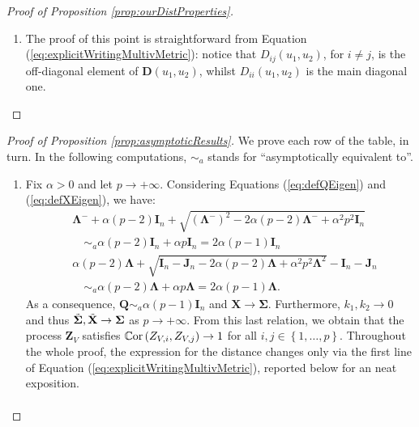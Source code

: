 \documentclass[12pt]{article}
\theoremstyle{plain}
\theoremstyle{remark}
\newcommand{\round}[1]{\left( #1 \right)}
\newcommand{\curly}[1]{\left\{ #1 \right\}}
\newcommand{\Corr}[2]{\mathbb{C}{\rm or}\round{#1,#2}}
\newcommand{\latMatr}[1]{\mathbf{#1}}          %
\newcommand{\grMatr}[1]{{\boldsymbol{#1}}}   %
\newcommand{\rVec}[1]{{\bm{#1}}}            %
\newcommand{\tobi}[1]{\textcolor{teal}{#1}}
\begin{document}
\begin{proof}[Proof of Proposition \ref{prop:ourDistProperties}]
\begin{enumerate}
            \item The proof of this point is straightforward from Equation (\ref{eq:explicitWritingMultivMetric}): notice that ${D}_{ij}(u_1,u_2)$, for $i\ne j$, is the off-diagonal element of ${\latMatr{D}}(u_1,u_2)$, whilst ${D}_{ii}(u_1,u_2)$ is the main diagonal one.
        \end{enumerate}
    \end{proof}
    
    
    \begin{proof}[Proof of Proposition \ref{prop:asymptoticResults}]
        We prove each row of the table, in turn. In the following computations, $\sim_a$ stands for ``asymptotically equivalent to''.
        \begin{enumerate}
            \item Fix $\alpha>0$ and let $p\to +\infty$. Considering Equations (\ref{eq:defQEigen}) and (\ref{eq:defXEigen}), we have: 
            \begin{align}
                \label{eq:asymptQ1}
                &\grMatr{\Lambda}^- + \alpha(p-2)\latMatr{I}_n + \sqrt{(\grMatr{\Lambda}^-)^2-2\alpha(p-2)\grMatr{\Lambda}^-+\alpha^2 p^2 \latMatr{I}_n} \\
                &\quad \sim_a \alpha (p-2) \latMatr{I}_n + \alpha p \latMatr{I}_n = 2\alpha (p-1) \latMatr{I}_n\nonumber\\
                \label{eq:asymptX1}
                &\alpha(p-2)\grMatr{\Lambda} + \sqrt{\latMatr{I}_n - \latMatr{J}_n - 2\alpha (p-2) \grMatr{\Lambda} + \alpha^2 p^2 \grMatr{\Lambda}^2} -\latMatr{I}_n - \latMatr{J}_n \\
                &\quad \sim_a \alpha (p-2) \grMatr{\Lambda} + \alpha p \grMatr{\Lambda} = 2 \alpha (p-1) \grMatr{\Lambda}. \nonumber
            \end{align}
            As a consequence, $\latMatr Q \sim_a \alpha (p-1) \latMatr{I}_n$ and $\latMatr X \to \grMatr{\Sigma}$. Furthermore, $k_1,k_2\to 0$ and thus $\Tilde{\grMatr{\Sigma}}, \tilde{\latMatr X} \to \grMatr{\Sigma}$ as $p\to+\infty.$ From this last relation, we obtain that the process $\rVec Z_V$ satisfies $\Corr{Z_{V,i}}{Z_{V,j}}\to 1$ for all $i,j\in\curly{1,\dots,p}$. Throughout the whole proof, the expression for the distance changes only via the first line of Equation (\ref{eq:explicitWritingMultivMetric}), reported below for an neat exposition.
            \begin{align}
                \label{eq:appZ_V_contributionOnD}

\end{align}
\end{enumerate}
\end{proof}
\end{document}
